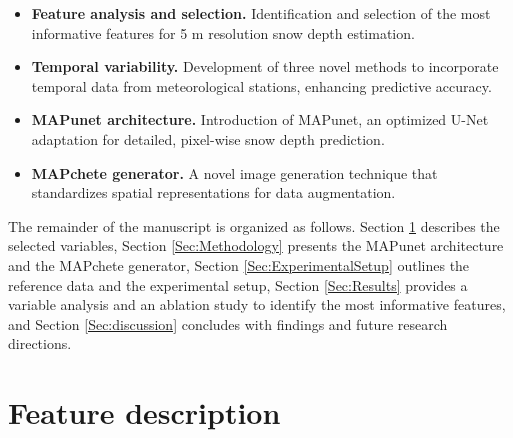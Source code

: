 \documentclass[preprint,12pt]{elsarticle}
\begin{document}
\begin{itemize}
\item \textbf{Feature analysis and selection.} Identification and selection of the most informative features for 5 m resolution snow depth estimation. %

\item \textbf{Temporal variability.} Development of three novel methods to incorporate temporal data from meteorological stations, enhancing predictive accuracy. %

\item \textbf{MAPunet architecture.} Introduction of MAPunet, an optimized U-Net adaptation for detailed, pixel-wise snow depth prediction. %

\item \textbf{MAPchete generator.} A novel image generation technique that standardizes spatial representations for data augmentation. %
\end{itemize}

The remainder of the manuscript is organized as follows. Section \ref{Sec:Features} describes the selected variables, Section \ref{Sec:Methodology} presents the MAPunet architecture and the MAPchete generator, Section \ref{Sec:ExperimentalSetup} outlines the reference data and the experimental setup, Section \ref{Sec:Results} provides a variable analysis and an ablation study to identify the most informative features, and Section \ref{Sec:discussion} concludes with findings and future research directions.

\section{Feature description} \label{Sec:Features}
\end{document}
